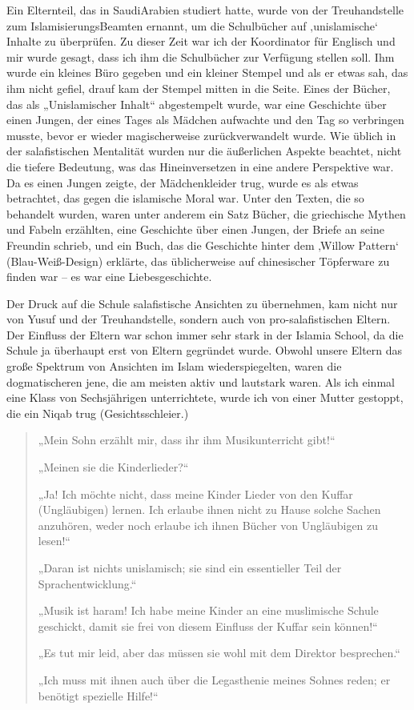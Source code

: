 \documentclass[12pt]{memoir}
\begin{document}
Ein Elternteil, das in Saudi\–Arabien studiert hatte,
wurde von der Treuhandstelle zum Islamisierungs\–Beamten ernannt,
um die Schulbücher auf ‚unislamische‘ Inhalte zu überprüfen.
Zu dieser Zeit war ich der Koordinator für Englisch
und mir wurde gesagt, dass ich ihm die Schulbücher zur Verfügung stellen soll.
Ihm wurde ein kleines Büro gegeben und ein kleiner Stempel
und als er etwas sah, das ihm nicht gefiel,
drauf kam der Stempel mitten in die Seite.
Eines der Bücher, das als „Unislamischer Inhalt“ abgestempelt wurde,
war eine Geschichte über einen Jungen,
der eines Tages als Mädchen aufwachte
und den Tag so verbringen musste,
bevor er wieder magischerweise zurückverwandelt wurde.
Wie üblich in der salafistischen Mentalität
wurden nur die äußerlichen Aspekte beachtet,
nicht die tiefere Bedeutung,
was das Hineinversetzen in eine andere Perspektive war.
Da es einen Jungen zeigte, der Mädchenkleider trug,
wurde es als etwas betrachtet, das gegen die islamische Moral war.
Unter den Texten, die so behandelt wurden,
waren unter anderem ein Satz Bücher,
die griechische Mythen und Fabeln erzählten,
eine Geschichte über einen Jungen, der Briefe an seine Freundin schrieb,
und ein Buch, das die Geschichte hinter
dem ‚Willow Pattern‘ (Blau-Weiß-Design) erklärte,
das üblicherweise auf chinesischer Töpferware zu finden war –
es war eine Liebesgeschichte.

Der Druck auf die Schule salafistische Ansichten zu übernehmen,
kam nicht nur von Yusuf und der Treuhandstelle,
sondern auch von pro-salafistischen Eltern.
Der Einfluss der Eltern war schon immer sehr stark in der Islamia School,
da die Schule ja überhaupt erst von Eltern gegründet wurde.
Obwohl unsere Eltern das große Spektrum von Ansichten im Islam wiederspiegelten,
waren die dogmatischeren jene, die am meisten aktiv und lautstark waren.
Als ich einmal eine Klass von Sechsjährigen unterrichtete,
wurde ich von einer Mutter gestoppt, die ein Niqab trug (Gesichtsschleier.)

\begin{quote}
„Mein Sohn erzählt mir, dass ihr ihm Musikunterricht gibt!“

„Meinen sie die Kinderlieder?“

„Ja! Ich möchte nicht, dass meine Kinder Lieder von den Kuffar
(Ungläubigen) lernen.
Ich erlaube ihnen nicht zu Hause solche Sachen anzuhören,
weder noch erlaube ich ihnen Bücher von Ungläubigen zu lesen!“

„Daran ist nichts unislamisch;
sie sind ein essentieller Teil der Sprachentwicklung.“

„Musik ist haram! Ich habe meine Kinder an eine muslimische Schule geschickt,
damit sie frei von diesem Einfluss der Kuffar sein können!“

„Es tut mir leid, aber das müssen sie wohl mit dem Direktor besprechen.“

„Ich muss mit ihnen auch über die Legasthenie meines Sohnes reden;
er benötigt spezielle Hilfe!“
\end{quote}
\end{document}
